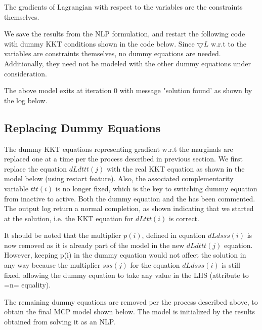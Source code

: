 \documentclass{article}
\begin{document}
The gradients of Lagrangian with respect to the variables are the constraints themselves. 

We save the results from the NLP formulation, and restart the following code with dummy KKT conditions shown in the code below. Since $\bigtriangledown L $ w.r.t to the variables are constraints themselves, no dummy equations are needed. Additionally, they need not be modeled with the other dummy equations under consideration.  



The above model exits at iteration 0 with message "solution found' as shown by the log below.



\subsection{Replacing Dummy Equations}

The dummy  KKT equations representing gradient w.r.t the marginals are replaced one at a time per the process described in previous section.  We first replace the equation $dLdttt(j)$ with the real KKT equation as shown in the model below (using restart feature). Also, the associated complementarity variable $ttt(i)$ is no longer fixed, which is the key to switching dummy equation from inactive to active. Both the dummy equation and the has been commented. The output log return a normal completion, as shown indicating that we started at the solution, i.e. the KKT equation for $dLttt(i)$ is correct. 

It should be noted that the multiplier $p(i)$, defined in equation $dLdsss(i)$ is now removed as it is already part of the model in the new $dLdttt(j)$ equation. However, keeping p(i) in the dummy equation would not affect the solution in any way because the multiplier $sss(j)$ for the equation $dLdsss(i)$ is still fixed, allowing the dummy equation to take any value in the LHS (attribute to =n= equality).






The remaining dummy equations are removed per the process described above, to obtain the final MCP model shown below. The model is initialized by the results obtained from solving it as an NLP. 


\end{document}
